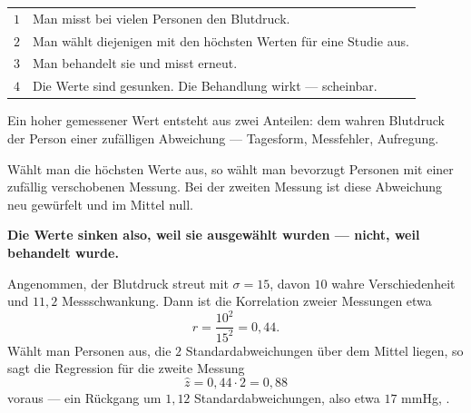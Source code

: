 \begin{warnung}
\begin{center}
\renewcommand{\arraystretch}{1.5}
\begin{tabular}{@{}P{1.0cm}P{7.4cm}@{}}
\toprule
$1$ & Man misst bei vielen Personen den Blutdruck.\\
$2$ & Man wählt diejenigen mit den höchsten Werten für eine Studie aus.\\
$3$ & Man behandelt sie und misst erneut.\\
$4$ & Die Werte sind gesunken. Die Behandlung wirkt --- scheinbar.\\
\bottomrule
\end{tabular}
\end{center}

Ein hoher gemessener Wert entsteht aus zwei Anteilen: dem wahren Blutdruck der Person  einer zufälligen Abweichung --- Tagesform, Messfehler, Aufregung.

Wählt man die höchsten Werte aus, so wählt man bevorzugt Personen mit einer zufällig  verschobenen Messung. Bei der zweiten Messung ist diese Abweichung neu gewürfelt und im Mittel null.

\begin{center}
\begin{minipage}{0.9\textwidth}
\textbf{Die Werte sinken also, weil sie ausgewählt wurden --- nicht, weil behandelt wurde.}
\end{minipage}
\end{center}

Angenommen, der Blutdruck streut mit $\sigma = 15$, davon $10$ wahre Verschiedenheit und $11{,}2$ Messschwankung. Dann ist die Korrelation zweier Messungen etwa
\[ r = \frac{10^2}{15^2} = 0{,}44 . \]
Wählt man Personen aus, die $2$ Standardabweichungen über dem Mittel liegen, so sagt die Regression für die zweite Messung
\[ \hat z = 0{,}44 \cdot 2 = 0{,}88 \]
voraus --- ein Rückgang um $1{,}12$ Standardabweichungen, also etwa $17$ mmHg, .

\begin{center}
\begin{minipage}{0.88\textwidth}
\end{minipage}
\end{center}


\end{warnung}

